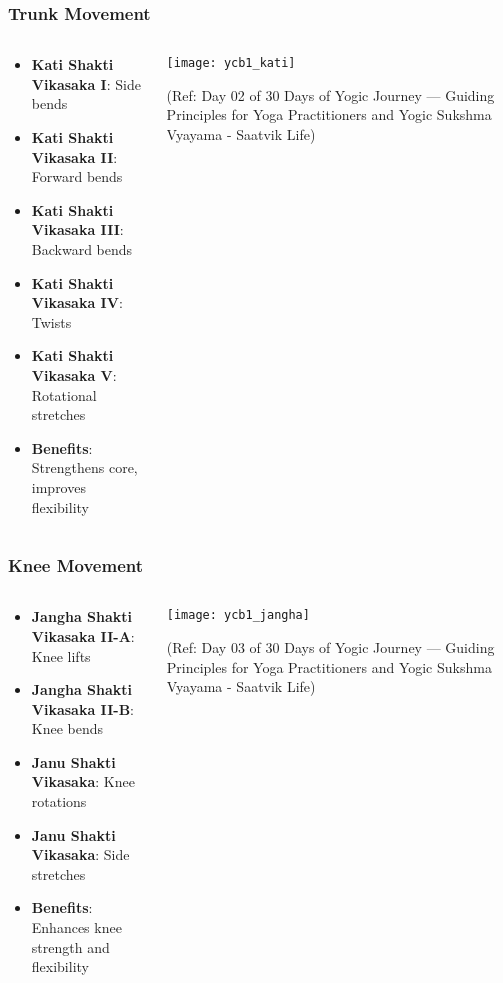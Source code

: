 \begin{frame}[fragile]\frametitle{Trunk Movement}
\begin{columns}
    \begin{column}[T]{0.5\linewidth}
      \begin{itemize}
		\item \textbf{Kati Shakti Vikasaka I}: Side bends
		\item \textbf{Kati Shakti Vikasaka II}: Forward bends
		\item \textbf{Kati Shakti Vikasaka III}: Backward bends
		\item \textbf{Kati Shakti Vikasaka IV}: Twists
		\item \textbf{Kati Shakti Vikasaka V}: Rotational stretches
		\item \textbf{Benefits}: Strengthens core, improves flexibility
	  \end{itemize}
    \end{column}
    \begin{column}[T]{0.5\linewidth}
		\begin{center}
		        \texttt{[image: ycb1\_kati]}
				
				{\tiny (Ref: Day 02 of 30 Days of Yogic Journey — Guiding Principles for Yoga Practitioners and Yogic Sukshma Vyayama - Saatvik Life)}	
		\end{center}	
    \end{column}
\end{columns}
\end{frame}

\begin{frame}[fragile]\frametitle{Knee Movement}
\begin{columns}
    \begin{column}[T]{0.5\linewidth}
      \begin{itemize}
		\item \textbf{Jangha Shakti Vikasaka II-A}: Knee lifts
		\item \textbf{Jangha Shakti Vikasaka II-B}: Knee bends
		\item \textbf{Janu Shakti Vikasaka}: Knee rotations
		\item \textbf{Janu Shakti Vikasaka}: Side stretches
		\item \textbf{Benefits}: Enhances knee strength and flexibility
	  \end{itemize}
    \end{column}
    \begin{column}[T]{0.5\linewidth}
		\begin{center}
		\texttt{[image: ycb1\_jangha]}
		
		{\tiny (Ref: Day 03 of 30 Days of Yogic Journey — Guiding Principles for Yoga Practitioners and Yogic Sukshma Vyayama - Saatvik Life)}	

		\end{center}	
    \end{column}
\end{columns}
\end{frame}

